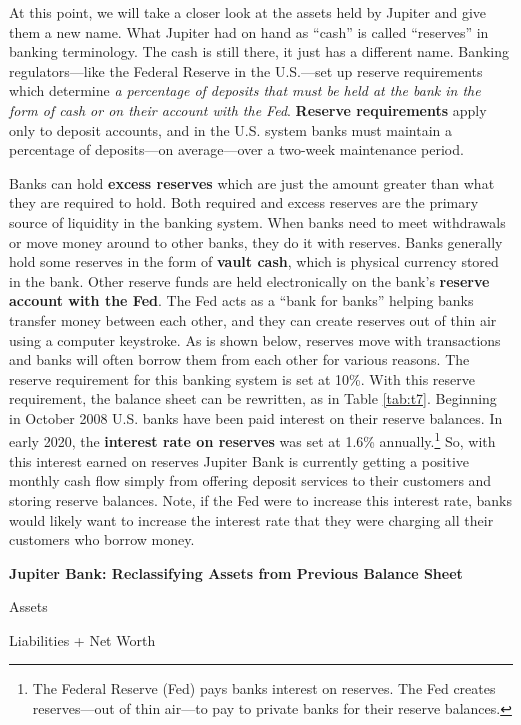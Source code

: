 \documentclass[
]{book}
\begin{document}
At this point, we will take a closer look at the assets held by Jupiter and give them a new name. What Jupiter had on hand as ``cash'' is called ``reserves'' in banking terminology. The cash is still there, it just has a different name. Banking regulators---like the Federal Reserve in the U.S.---set up reserve requirements which determine \emph{a percentage of deposits that must be held at the bank in the form of cash or on their account with the Fed}. \textbf{Reserve requirements} apply only to deposit accounts, and in the U.S. system banks must maintain a percentage of deposits---on average---over a two-week maintenance period.

Banks can hold \textbf{excess reserves} which are just the amount greater than what they are required to hold. Both required and excess reserves are the primary source of liquidity in the banking system. When banks need to meet withdrawals or move money around to other banks, they do it with reserves. Banks generally hold some reserves in the form of \textbf{vault cash}, which is physical currency stored in the bank. Other reserve funds are held electronically on the bank's \textbf{reserve account with the Fed}. The Fed acts as a ``bank for banks'' helping banks transfer money between each other, and they can create reserves out of thin air using a computer keystroke. As is shown below, reserves move with transactions and banks will often borrow them from each other for various reasons. The reserve requirement for this banking system is set at 10\%. With this reserve requirement, the balance sheet can be rewritten, as in Table \ref{tab:t7}. Beginning in October 2008 U.S. banks have been paid interest on their reserve balances. In early 2020, the \textbf{interest rate on reserves} was set at 1.6\% annually.\footnote{The Federal Reserve (Fed) pays banks interest on reserves. The Fed creates reserves---out of thin air---to pay to private banks for their reserve balances.} So, with this interest earned on reserves Jupiter Bank is currently getting a positive monthly cash flow simply from offering deposit services to their customers and storing reserve balances. Note, if the Fed were to increase this interest rate, banks would likely want to increase the interest rate that they were charging all their customers who borrow money.

\label{tab:t7}\textbf{Jupiter Bank: Reclassifying Assets from Previous Balance Sheet}

Assets

Liabilities + Net Worth
\end{document}
